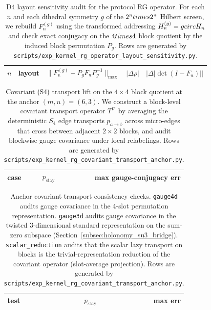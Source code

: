 \begin{table}[H]
\centering
\scriptsize
\setlength{\tabcolsep}{6pt}
\renewcommand{\arraystretch}{1.15}
\begin{tabular}{rr r r r}
\toprule
$n$ & layout & $\|F_n^{(g)}-P_gF_nP_g^{-1}\|_{\max}$ & $|\Delta\rho|$ & $|\Delta|\det(I-F_n)||$ \\
\midrule
%
\end{tabular}
\caption{D4 layout sensitivity audit for the protocol RG operator.
For each $n$ and each dihedral symmetry $g$ of the $2^n\\times2^n$ Hilbert screen, we rebuild $F_n^{(g)}$ using the transformed addressing $H_n^{(g)}=g\\circ H_n$ and check exact conjugacy on the $4\\times4$ block quotient by the induced block permutation $P_g$.
Rows are generated by \texttt{scripts/exp\_kernel\_rg\_operator\_layout\_sensitivity.py}.}
\label{tab:kernel_rg_operator_layout_sensitivity}
\end{table}

\begin{table}[H]
\centering
\scriptsize
\setlength{\tabcolsep}{6pt}
\renewcommand{\arraystretch}{1.15}
\begin{tabular}{lrr}
\toprule
case & $p_{\mathrm{stay}}$ & max gauge-conjugacy err \\
\midrule
%
\end{tabular}
\caption{Covariant (S4) transport lift on the $4\times4$ block quotient at the anchor $(m,n)=(6,3)$.
We construct a block-level covariant transport operator $T^\nabla$ by averaging the deterministic $S_4$ edge transports $p_{a\to b}$ across micro-edges that cross between adjacent $2\times2$ blocks, and audit blockwise gauge covariance under local relabelings.
Rows are generated by \texttt{scripts/exp\_kernel\_rg\_covariant\_transport\_anchor.py}.}
\label{tab:kernel_rg_covariant_transport_anchor}
\end{table}

\begin{table}[H]
\centering
\scriptsize
\setlength{\tabcolsep}{6pt}
\renewcommand{\arraystretch}{1.15}
\begin{tabular}{lrr}
\toprule
test & $p_{\mathrm{stay}}$ & max err \\
\midrule
%
\end{tabular}
\caption{Anchor covariant transport consistency checks.
\texttt{gauge4d} audits gauge covariance in the $4$-slot permutation representation.
\texttt{gauge3d} audits gauge covariance in the twisted $3$-dimensional standard representation on the sum-zero subspace (Section~\ref{subsec:holonomy_su3_bridge}).
\texttt{scalar\_reduction} audits that the scalar lazy transport on blocks is the trivial-representation reduction of the covariant operator (slot-average projection).
Rows are generated by \texttt{scripts/exp\_kernel\_rg\_covariant\_transport\_anchor.py}.}
\label{tab:kernel_rg_covariant_transport_reduction}
\end{table}


